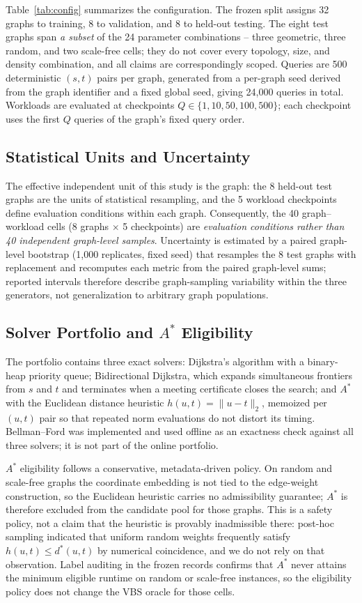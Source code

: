 \documentclass[conference]{IEEEtran}
\begin{document}
Table~\ref{tab:config} summarizes the configuration. The frozen split assigns 32 graphs to training, 8 to validation, and 8 to held-out testing. The eight test graphs span \emph{a subset} of the 24 parameter combinations -- three geometric, three random, and two scale-free cells; they do not cover every topology, size, and density combination, and all claims are correspondingly scoped. Queries are 500 deterministic $(s,t)$ pairs per graph, generated from a per-graph seed derived from the graph identifier and a fixed global seed, giving 24,000 queries in total. Workloads are evaluated at checkpoints $Q \in \{1,10,50,100,500\}$; each checkpoint uses the first $Q$ queries of the graph's fixed query order.

\subsection{Statistical Units and Uncertainty}
The effective independent unit of this study is the graph: the 8 held-out test graphs are the units of statistical resampling, and the 5 workload checkpoints define evaluation conditions within each graph. Consequently, the 40 graph--workload cells (8 graphs $\times$ 5 checkpoints) are \emph{evaluation conditions rather than 40 independent graph-level samples}. Uncertainty is estimated by a paired graph-level bootstrap \cite{efron1994} (1,000 replicates, fixed seed) that resamples the 8 test graphs with replacement and recomputes each metric from the paired graph-level sums; reported intervals therefore describe graph-sampling variability within the three generators, not generalization to arbitrary graph populations.

\subsection{Solver Portfolio and $A^*$ Eligibility}
The portfolio contains three exact solvers: Dijkstra's algorithm with a binary-heap priority queue; Bidirectional Dijkstra, which expands simultaneous frontiers from $s$ and $t$ and terminates when a meeting certificate closes the search; and $A^*$ with the Euclidean distance heuristic $h(u,t)=\lVert u-t\rVert_2$, memoized per $(u,t)$ pair so that repeated norm evaluations do not distort its timing. Bellman--Ford was implemented and used offline as an exactness check against all three solvers; it is not part of the online portfolio.

$A^*$ eligibility follows a conservative, metadata-driven policy. On random and scale-free graphs the coordinate embedding is not tied to the edge-weight construction, so the Euclidean heuristic carries no admissibility guarantee; $A^*$ is therefore excluded from the candidate pool for those graphs. This is a safety policy, not a claim that the heuristic is provably inadmissible there: post-hoc sampling indicated that uniform random weights frequently satisfy $h(u,t) \le d^{*}(u,t)$ by numerical coincidence, and we do not rely on that observation. Label auditing in the frozen records confirms that $A^*$ never attains the minimum eligible runtime on random or scale-free instances, so the eligibility policy does not change the VBS oracle for those cells.
\end{document}
